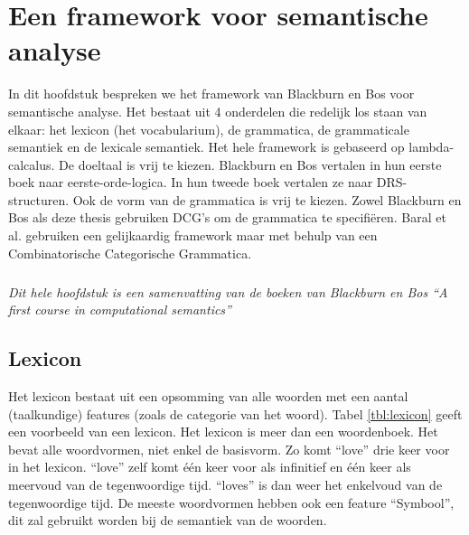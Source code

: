 \chapter{Een framework voor semantische analyse}
In dit hoofdstuk bespreken we het framework van Blackburn en Bos \cite{Blackburn2005, Blackburn2006} voor semantische analyse. Het bestaat uit 4 onderdelen die redelijk los staan van elkaar: het lexicon (het vocabularium), de grammatica, de grammaticale semantiek en de lexicale semantiek. Het hele framework is gebaseerd op lambda-calcalus. De doeltaal is vrij te kiezen. Blackburn en Bos vertalen in hun eerste boek \cite{Blackburn2005} naar eerste-orde-logica. In hun tweede boek \cite{Blackburn2006} vertalen ze naar DRS-structuren. Ook de vorm van de grammatica is vrij te kiezen. Zowel Blackburn en Bos als deze thesis gebruiken DCG's om de grammatica te specifiëren. Baral et al. \cite{Baral2008} gebruiken een gelijkaardig framework maar met behulp van een Combinatorische Categorische Grammatica.

\paragraph{} \textit{Dit hele hoofdstuk is een samenvatting van de boeken van Blackburn en Bos \cite{Blackburn2005, Blackburn2006} ``A first course in computational semantics''}

\section{Lexicon}
Het lexicon bestaat uit een opsomming van alle woorden met een aantal (taalkundige) features (zoals de categorie van het woord). Tabel \ref{tbl:lexicon} geeft een voorbeeld van een lexicon. Het lexicon is meer dan een woordenboek. Het bevat alle woordvormen, niet enkel de basisvorm. Zo komt ``love'' drie keer voor in het lexicon. ``love'' zelf komt één keer voor als infinitief en één keer als meervoud van de tegenwoordige tijd. ``loves'' is dan weer het enkelvoud van de tegenwoordige tijd. De meeste woordvormen hebben ook een feature ``Symbool'', dit zal gebruikt worden bij de semantiek van de woorden.


